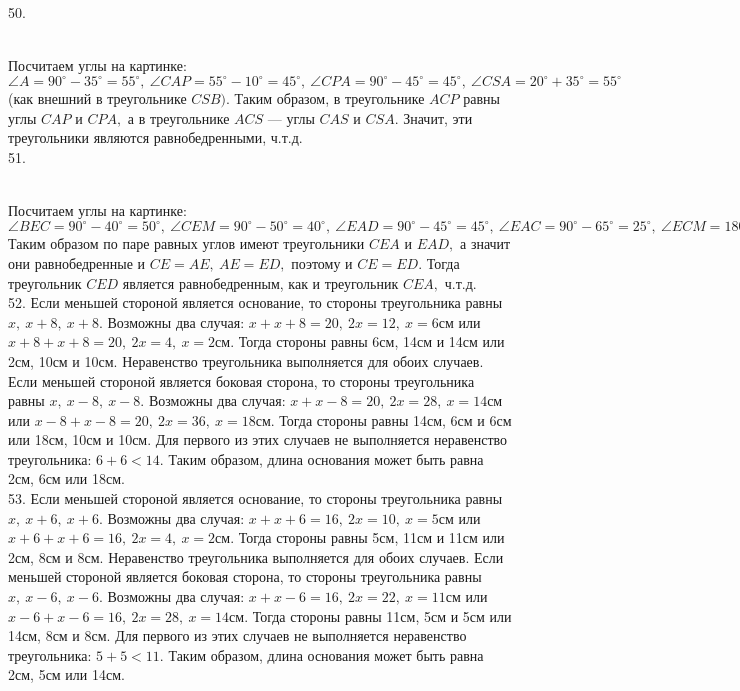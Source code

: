 50. \begin{figure}[ht!]
\end{figure}\\
Посчитаем углы на картинке: $\angle A=90^\circ-35^\circ=55^\circ,\ \angle CAP=55^\circ-10^\circ=45^\circ,\ \angle CPA=90^\circ-45^\circ=45^\circ,\ \angle CSA=20^\circ+35^\circ=55^\circ$ (как внешний в треугольнике $CSB).$ Таким образом, в треугольнике $ACP$ равны углы $CAP$ и $CPA,$ а в треугольнике $ACS$ --- углы $CAS$ и $CSA.$ Значит, эти треугольники являются равнобедренными, ч.т.д.\\
51. \begin{figure}[ht!]
\end{figure}\\
Посчитаем углы на картинке: $\angle BEC=90^\circ-40^\circ=50^\circ,\ \angle CEM=90^\circ-50^\circ=40^\circ,\ \angle EAD=90^\circ-45^\circ=45^\circ,\ \angle EAC=90^\circ-65^\circ=25^\circ,\ \angle ECM=180^\circ-90^\circ-40^\circ-25^\circ=25^\circ.$ Таким образом по паре равных углов имеют треугольники $CEA$ и $EAD,$ а значит они равнобедренные и $CE=AE,\ AE=ED,$ поэтому и $CE=ED.$ Тогда треугольник $CED$ является равнобедренным, как и треугольник $CEA,$ ч.т.д.\\
52. Если меньшей стороной является основание, то стороны треугольника равны $x,\ x+8,\ x+8.$ Возможны два случая: $x+x+8=20,\ 2x=12,\ x=6$см или $x+8+x+8=20,\ 2x=4,\ x=2$см. Тогда стороны равны 6см, 14см и 14см или 2см, 10см и 10см. Неравенство треугольника выполняется для обоих случаев. Если меньшей стороной является боковая сторона, то стороны треугольника равны $x,\ x-8,\ x-8.$ Возможны два случая: $x+x-8=20,\ 2x=28,\ x=14$см или $x-8+x-8=20,\ 2x=36,\ x=18$см. Тогда стороны равны 14см, 6см и 6см или 18см, 10см и 10см. Для первого из этих случаев не выполняется неравенство треугольника: $6+6<14.$ Таким образом, длина основания может быть равна 2см, 6см или 18см.\\
53. Если меньшей стороной является основание, то стороны треугольника равны $x,\ x+6,\ x+6.$ Возможны два случая: $x+x+6=16,\ 2x=10,\ x=5$см или $x+6+x+6=16,\ 2x=4,\ x=2$см. Тогда стороны равны 5см, 11см и 11см или 2см, 8см и 8см. Неравенство треугольника выполняется для обоих случаев. Если меньшей стороной является боковая сторона, то стороны треугольника равны $x,\ x-6,\ x-6.$ Возможны два случая: $x+x-6=16,\ 2x=22,\ x=11$см или $x-6+x-6=16,\ 2x=28,\ x=14$см. Тогда стороны равны 11см, 5см и 5см или 14см, 8см и 8см. Для первого из этих случаев не выполняется неравенство треугольника: $5+5<11.$ Таким образом, длина основания может быть равна 2см, 5см или 14см.\\
